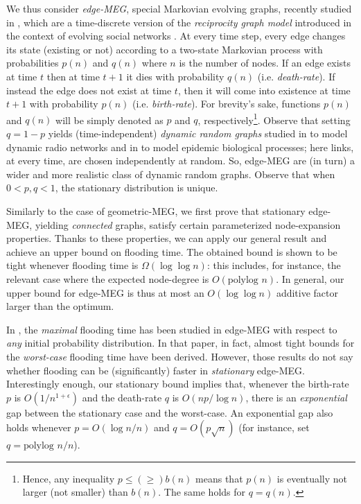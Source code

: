 \documentclass[10pt,a4paper]{article}
\newcommand{\polylog }{\mbox{polylog }}
\begin{document}
We thus consider \emph{edge-MEG}, special Markovian evolving graphs, recently studied in \cite{CMMPS08,BCF09}, which are a time-discrete version of the \emph{reciprocity graph model} introduced in the context of evolving social networks \cite{W80}. At every time step, every edge changes its state (existing or not) according to a two-state Markovian process with probabilities $p(n)$ and $q(n)$ where $n$ is the number of nodes. If an edge exists at time $t$ then at time $t+1$ it dies with probability $q(n)$ (i.e. \emph{death-rate}). If instead the edge does not exist at time $t$, then it will come into existence at time $t+1$ with probability $p(n)$ (i.e. \emph{birth-rate}). For brevity's sake, functions $p(n)$ and $q(n)$ will be simply denoted as $p$ and $q$, respectively\footnote{Hence, any inequality $p \leqslant (\geqslant) b(n)$ means that $p(n)$ is eventually not larger (not smaller) than $b(n)$. The same holds for $q = q(n)$.}. Observe that setting $q = 1-p$ yields (time-independent) \emph{dynamic random graphs}   studied in \cite{CMPS07} to model dynamic radio networks and in \cite{BDW08} to model  epidemic biological  processes; here   links, at every time, are chosen independently at random. So, edge-MEG are (in turn) a wider and more realistic class of dynamic random graphs. Observe that when $0 < p,q <1$, the stationary distribution is unique.

Similarly to the case of geometric-MEG, we first prove that stationary edge-MEG, yielding \emph{connected} graphs, satisfy certain parameterized node-expansion properties. Thanks to these properties, we can apply our general result and achieve an upper bound on flooding time. The obtained bound is shown to be tight whenever flooding time is $\Omega(\log\log n)$: this includes, for instance, the relevant case where the expected node-degree is $O(\polylog n)$. In general, our upper bound for edge-MEG is thus at most an $O(\log\log n)$ additive factor larger than the optimum.

In \cite{CMMPS08}, the \emph{maximal} flooding time has been studied  in edge-MEG with respect to \emph{any} initial probability distribution. In that paper, in fact, almost tight bounds for the \emph{worst-case} flooding time have been derived. However, those results do not say whether flooding can be (significantly) faster in \emph{stationary} edge-MEG. Interestingly enough, our stationary bound implies that, whenever the birth-rate $p$ is $O(1/n^{1+\epsilon})$ and the death-rate $q$ is $O(np/\log n)$, there is an \emph{exponential} gap between the stationary case and the worst-case. An exponential gap also holds whenever $p = O(\log n/n)$ and $q = O(p \sqrt n)$ (for instance, set $q = \polylog n /n$).
\end{document}
